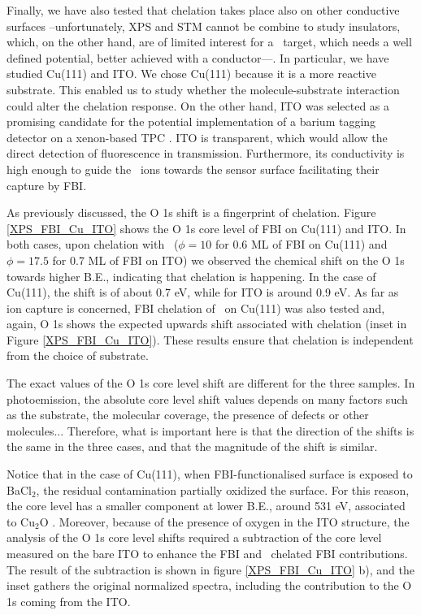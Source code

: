\documentclass[aps,prl,reprint,longbibliography,superscriptaddress, english]{revtex4-1}
\def\BappCl{BaCl$_2$}
\begin{document}
Finally, we have also tested that chelation takes place also on other conductive surfaces --unfortunately, XPS and STM cannot be combine to study insulators, which, on the other hand, are of limited interest for a \Bapp\ target, which needs a well defined potential, better achieved with a conductor---. In particular, we have studied Cu(111) and ITO. We chose Cu(111) because it is a more reactive substrate. This enabled us to study whether the molecule-substrate interaction could alter the chelation response. On the other hand, ITO was selected as a promising candidate for the potential implementation of a barium tagging detector on a xenon-based TPC \cite{rivilla_fluorescent_2020}. ITO is transparent, which would allow the direct detection of fluorescence in transmission. Furthermore, its conductivity is high enough to guide the \Bapp\ ions towards the sensor surface facilitating their capture by FBI. 

As previously discussed, the O 1s shift is a fingerprint of chelation. Figure \ref{XPS_FBI_Cu_ITO} shows the O 1s core level of FBI on Cu(111) and ITO. In both cases, upon chelation with \Bapp\ ($\phi = 10$ for 0.6 ML of FBI on Cu(111) and $\phi = 17.5$ for 0.7 ML of FBI on ITO) we observed the chemical shift on the O 1s towards higher B.E., indicating that chelation is happening. In the case of Cu(111), the shift is of about 0.7 eV, while for ITO is around 0.9 eV. As far as ion capture is concerned, FBI chelation of \Nap\  on Cu(111) was also tested and, again, O 1s shows the expected upwards shift associated with chelation (inset in Figure \ref{XPS_FBI_Cu_ITO}). These results ensure that chelation is independent from the choice of substrate.

The exact values of the O 1s core level shift are different for the three samples. In photoemission, the absolute core level shift values depends on many factors such as the substrate, the molecular coverage, the presence of defects or other molecules... Therefore, what is important here is that the direction of the shifts is the same in the three cases, and that the magnitude of the shift is similar. 

Notice that in the case of Cu(111), when FBI-functionalised surface is exposed to \BappCl, the residual contamination partially oxidized the surface. For this reason, the core level has a smaller component at lower B.E., around 531 eV, associated to  Cu$_2$O \cite{zhu_surface_2013}. Moreover, because of the presence of oxygen in the ITO structure, the analysis of the O 1s core level shifts required a subtraction of the core level measured on the bare ITO to enhance the FBI and \Bapp\ chelated FBI contributions. The result of the subtraction is shown in figure \ref{XPS_FBI_Cu_ITO} b), and the inset gathers the original normalized spectra, including the contribution to the  O 1s coming from the ITO.  
\end{document}
